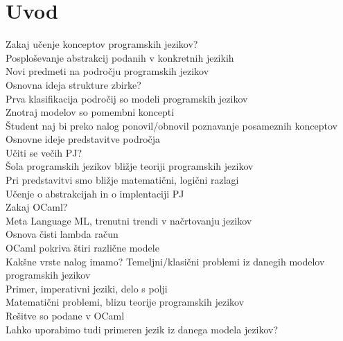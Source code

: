 \chapter{Uvod}

\noindent
Zakaj učenje konceptov programskih jezikov? \\
Posploševanje abstrakcij podanih v konkretnih jezikih \\
Novi predmeti na področju programskih jezikov \\

\noindent
Osnovna ideja strukture zbirke? \\
Prva klasifikacija področij so modeli programskih jezikov \\
Znotraj modelov so pomembni koncepti \\
Študent naj bi preko nalog ponovil/obnovil poznavanje posameznih konceptov \\

\noindent
Osnovne ideje predstavitve področja \\
Učiti se večih PJ? \\
Šola programskih jezikov bližje teoriji programskih jezikov \\
Pri predstavitvi smo bližje matematični, logični razlagi \\
Učenje o abstrakcijah in o implentaciji PJ \\

\noindent
Zakaj OCaml? \\
Meta Language ML, trenutni trendi v načrtovanju jezikov \\ 
Osnova čisti lambda račun \\
OCaml pokriva štiri različne modele \\

\noindent
Kakšne vrste nalog imamo?
Temeljni/klasični problemi iz danegih modelov programskih jezikov \\
Primer, imperativni jeziki, delo s polji \\
Matematični problemi, blizu teorije programskih jezikov \\

\noindent
Rešitve so podane v OCaml \\
Lahko uporabimo tudi primeren jezik iz danega modela jezikov? \\




